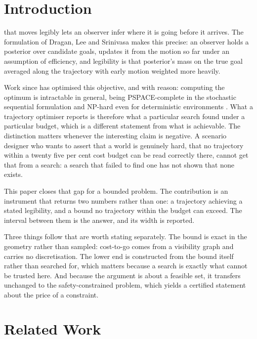 \documentclass[journal]{IEEEtran}
\begin{document}
\section{Introduction}
\label{sec:introduction}

 that moves legibly lets an observer infer where it is
going before it arrives. The formulation of Dragan, Lee and Srinivasa
\cite{dragan2013legibility} makes this precise: an observer holds a posterior
over candidate goals, updates it from the motion so far under an assumption of
efficiency, and legibility is that posterior's mass on the true goal averaged
along the trajectory with early motion weighted more heavily.

Work since has optimised this objective, and with reason: computing the
optimum is intractable in general, being PSPACE-complete in the stochastic
sequential formulation and NP-hard even for deterministic environments
\cite{miura2021unifying}. What a trajectory optimiser reports is therefore
what a particular search found under a particular budget, which is a different
statement from what is achievable. The distinction matters whenever the
interesting claim is negative. A scenario designer who wants to assert that a
world is genuinely hard, that no trajectory within a twenty five per cent cost
budget can be read correctly there, cannot get that from a search: a search
that failed to find one has not shown that none exists.

This paper closes that gap for a bounded problem. The contribution is an
instrument that returns two numbers rather than one: a trajectory achieving a
stated legibility, and a bound no trajectory within the budget can exceed. The
interval between them is the answer, and its width is reported.

Three things follow that are worth stating separately. The bound is exact in
the geometry rather than sampled: cost-to-go comes from a visibility graph and
carries no discretisation. The lower end is constructed from the bound itself
rather than searched for, which matters because a search is exactly what
cannot be trusted here. And because the argument is about a feasible set, it
transfers unchanged to the safety-constrained problem, which yields a
certified statement about the price of a constraint.

\section{Related Work}
\label{sec:related}
\end{document}
